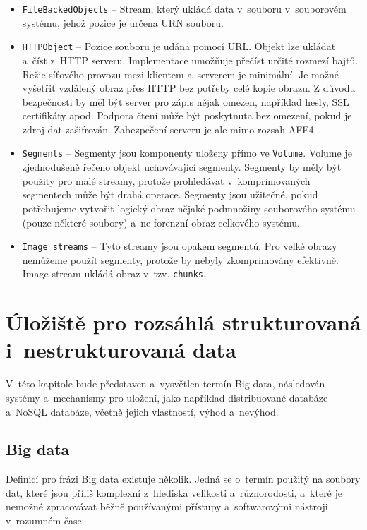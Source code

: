 \begin{itemize}
\item \texttt{FileBackedObjects} -- Stream, který ukládá data v~souboru v~souborovém systému, jehož pozice je určena URN souboru.

\item \texttt{HTTPObject} -- Pozice souboru je udána pomocí URL. Objekt lze ukládat a~číst z~HTTP serveru. Implementace umožňuje přečíst určité rozmezí bajtů. Režie síťového provozu mezi klientem a~serverem je minimální. Je možné vyšetřit vzdálený obraz přes HTTP bez potřeby celé kopie obrazu. Z důvodu bezpečnosti by měl být server pro zápis nějak omezen, například hesly, SSL certifikáty apod. Podpora čtení může být poskytnuta bez omezení, pokud je zdroj dat zašifrován. Zabezpečení serveru je ale mimo rozsah AFF4.

\item \texttt{Segments} -- Segmenty jsou komponenty uloženy přímo ve \texttt{Volume}. Volume je zjednodušeně řečeno objekt uchovávající segmenty. Segmenty by měly být použity pro malé streamy, protože prohledávat v~komprimovaných segmentech může být drahá operace. Segmenty jsou užitečné, pokud potřebujeme vytvořit logický obraz nějaké podmnožiny souborového systému (pouze některé soubory) a~ne forenzní obraz celkového systému.

\item \texttt{Image streams} -- Tyto streamy jsou opakem segmentů. Pro velké obrazy nemůžeme použít segmenty, protože by nebyly zkomprimovány efektivně. Image stream ukládá obraz v~tzv. \texttt{chunks}.
\end{itemize}

\chapter{Úložiště pro rozsáhlá strukturovaná i~nestrukturovaná data} \label{chapter2}
V~této kapitole bude představen a~vysvětlen termín Big data, následován systémy a~mechanismy pro uložení, jako například distribuované databáze a~NoSQL databáze, včetně jejich vlastností, výhod a~nevýhod.

\section{Big data} \label{bigDataSection}
Definicí pro frázi Big data existuje několik. Jedná se o~termín použitý na soubory dat, které jsou příliš komplexní z~hlediska velikosti a~různorodosti, a~které je nemožné zpracovávat běžně používanými přístupy a~softwarovými nástroji v~rozumném čase.

